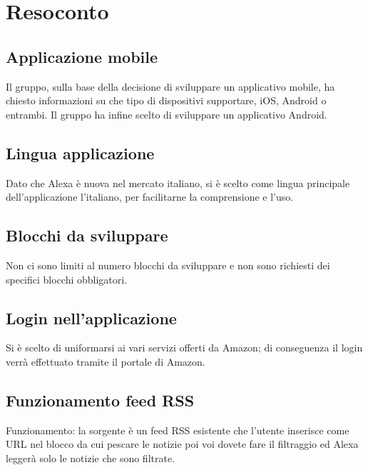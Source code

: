 \section{Resoconto}
\subsection{Applicazione mobile}
Il gruppo, sulla base della decisione di sviluppare un applicativo mobile, ha chiesto informazioni su che tipo di dispositivi supportare, iOS, Android o entrambi. Il gruppo ha infine scelto di sviluppare un applicativo Android.

\subsection{Lingua applicazione}
Dato che Alexa è nuova nel mercato italiano, si è scelto come lingua principale dell'applicazione l'italiano, per facilitarne la comprensione e l'uso.

\subsection{Blocchi da sviluppare}
Non ci sono limiti al numero blocchi da sviluppare e non sono richiesti dei specifici blocchi obbligatori.

\subsection{Login nell'applicazione}
Si è scelto di uniformarsi ai vari servizi offerti da Amazon; di conseguenza il login verrà effettuato tramite il portale di Amazon.

\subsection{Funzionamento feed RSS}
Funzionamento: la sorgente è un feed RSS esistente che l’utente inserisce come URL nel blocco da cui pescare le notizie poi voi dovete fare il filtraggio ed Alexa leggerà solo le notizie che sono filtrate.
